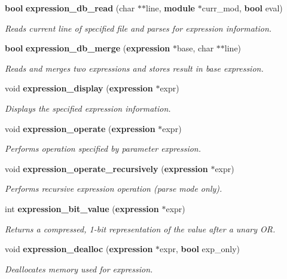 \begin{CompactItemize}
{\bf bool} {\bf expression\_\-db\_\-read} (char $\ast$$\ast$line, {\bf module} $\ast$curr\_\-mod, {\bf bool} eval)
\begin{CompactList}\small\item\em Reads current line of specified file and parses for expression information.\item\end{CompactList}\item 
{\bf bool} {\bf expression\_\-db\_\-merge} ({\bf expression} $\ast$base, char $\ast$$\ast$line)
\begin{CompactList}\small\item\em Reads and merges two expressions and stores result in base expression.\item\end{CompactList}\item 
void {\bf expression\_\-display} ({\bf expression} $\ast$expr)
\begin{CompactList}\small\item\em Displays the specified expression information.\item\end{CompactList}\item 
void {\bf expression\_\-operate} ({\bf expression} $\ast$expr)
\begin{CompactList}\small\item\em Performs operation specified by parameter expression.\item\end{CompactList}\item 
void {\bf expression\_\-operate\_\-recursively} ({\bf expression} $\ast$expr)
\begin{CompactList}\small\item\em Performs recursive expression operation (parse mode only).\item\end{CompactList}\item 
int {\bf expression\_\-bit\_\-value} ({\bf expression} $\ast$expr)
\begin{CompactList}\small\item\em Returns a compressed, 1-bit representation of the value after a unary OR.\item\end{CompactList}\item 
void {\bf expression\_\-dealloc} ({\bf expression} $\ast$expr, {\bf bool} exp\_\-only)
\begin{CompactList}\small\item\em Deallocates memory used for expression.\item\end{CompactList}\end{CompactItemize}
